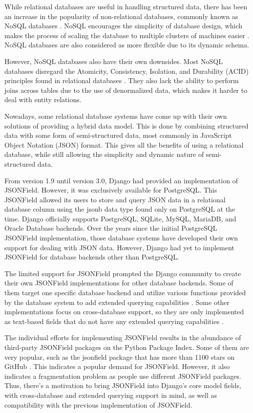 While relational databases are useful in handling structured data, there has
been an increase in the popularity of non-relational databases, commonly known
as NoSQL databases \cite{paul_nosql}. NoSQL encourages the simplicity of
database design, which makes the process of scaling the database to multiple
clusters of machines easier \cite{leavitt_nosql}. NoSQL databases are also
considered as more flexible due to its dynamic schema.

However, NoSQL databases also have their own downsides. Most NoSQL databases
disregard the Atomicity, Consistency, Isolation, and Durability (ACID)
principles found in relational databases \cite{kyle_mongodb}. They also lack
the ability to perform joins across tables due to the use of denormalized data,
which makes it harder to deal with entity relations.

Nowadays, some relational database systems have come up with their own
solutions of providing a hybrid data model. This is done by combining
structured data with some form of semi-structured data, most commonly in
JavaScript Object Notation (JSON) format. This gives all the benefits of using
a relational database, while still allowing the simplicity and dynamic nature
of semi-structured data.

From version 1.9 until version 3.0, Django had provided an implementation of
JSONField. However, it was exclusively available for PostgreSQL. This JSONField
allowed its users to store and query JSON data in a relational database column
using the jsonb data type found only on PostgreSQL at the time. Django
officially supports PostgreSQL, SQLite, MySQL, MariaDB, and Oracle Database
backends. Over the years since the initial PostgreSQL JSONField implementation,
those database systems have developed their own support for dealing with JSON
data. However, Django had yet to implement JSONField for database backends
other than PostgreSQL.

The limited support for JSONField prompted the Django community to create their
own JSONField implementations for other database backends. Some of them target
one specific database backend and utilize various functions provided by the
database system to add extended querying capabilities \cite{mysql_jsonfield}
\cite{oracle_jsonfield}. Some other implementations focus on cross-database
support, so they are only implemented as text-based fields that do not have any
extended querying capabilities \cite{ryan_jsonfield}.

The individual efforts for implementing JSONField results in the abundance of
third-party JSONField packages on the Python Package Index. Some of them are
very popular, such as the jsonfield package that has more than 1100 stars on
GitHub \cite{ryan_jsonfield}. This indicates a popular demand for JSONField.
However, it also indicates a fragmentation problem as people use different
JSONField packages. Thus, there's a motivation to bring JSONField into Django's
core model fields, with cross-database and extended querying support in mind,
as well as compatibility with the previous implementation of JSONField.

